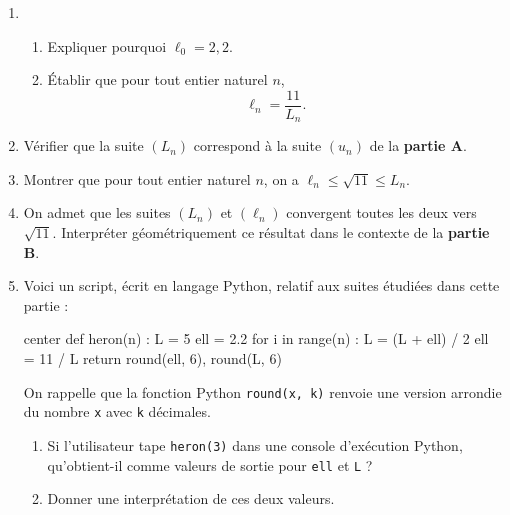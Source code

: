 \begin{enumerate}
	\item 
	\begin{enumerate}
		\item Expliquer pourquoi $\ell_{0}=2,2$.
		\item Établir que pour tout entier naturel $n$, \[\ell_{n}=\frac{11}{L_{n}}.\]
	\end{enumerate}
	\item Vérifier que la suite $\left(L_{n}\right)$ correspond à la suite $\left(u_{n}\right)$ de la \textbf{partie A}.
	\item Montrer que pour tout entier naturel $n$, on a $\ell_{n} \leqslant \sqrt{11} \leqslant L_{n}$.
	\item On admet que les suites $\left(L_{n}\right)$ et $\left(\ell_{n}\right)$ convergent toutes les deux vers $\sqrt{11}$. Interpréter géométriquement ce résultat dans le contexte de la \textbf{partie B}.
	\item Voici un script, écrit en langage \textsf{Python}, relatif aux suites étudiées dans cette partie :

\begin{CodePythonLstAlt}[Largeur=8cm]{center}
def heron(n) :
	L = 5
	ell = 2.2
	for i in range(n) :
		L = (L + ell) / 2
		ell = 11 / L
	return round(ell, 6), round(L, 6)
\end{CodePythonLstAlt}

	On rappelle que la fonction Python \texttt{round(x, k)} renvoie une version arrondie du nombre \texttt{x} avec \texttt{k} décimales.
	\begin{enumerate}
		\item Si l'utilisateur tape \texttt{heron(3)} dans une console d'exécution \textsf{Python}, qu'obtient-il comme valeurs de sortie pour \texttt{ell} et \texttt{L} ?
		\item Donner une interprétation de ces deux valeurs.
	\end{enumerate}
\end{enumerate}
